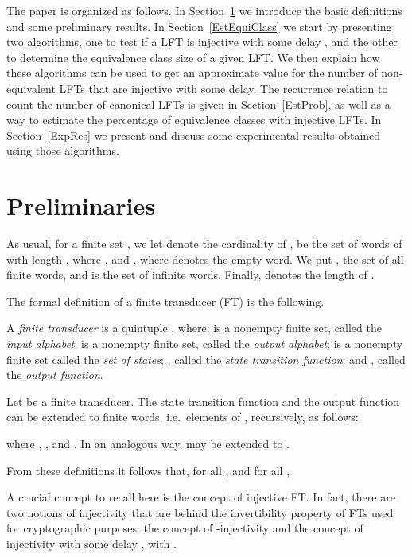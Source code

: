 \documentclass{ocg}
\newcommand{\FT}{FT}
\newcommand{\LFT}{LFT}
\begin{document}
The paper is organized as follows. In Section~\ref{preliminaries} we
introduce the basic definitions and some preliminary results. In
Section~\ref{EstEquiClass} we start by presenting two algorithms, one
to test if a \LFT{} is injective with some delay , and the other
to determine the equivalence class size of a given LFT{}. We then explain how these algorithms can be used to get an
approximate value for the number of non-equivalent \LFT{}s that are
injective with some delay. The recurrence relation to count the number
of canonical \LFT{}s is given in Section~\ref{EstProb}, as well as a
way to estimate the percentage of equivalence classes with injective
\LFT{}s. In Section~\ref{ExpRes} we present and discuss some
experimental results obtained using those algorithms.

\section{Preliminaries}\label{preliminaries}

As usual, for a finite set , we let  denote the cardinality of ,  be the set of words of  with length , where , and , where
 denotes the empty word. We put ,
the set of all finite words, and  is the set of infinite words.  Finally,
 denotes the length of .


The formal definition of a finite transducer (\FT{}) is the following.
\begin{definition}
  A \emph{finite transducer} is a quintuple
  , where:
   is a nonempty finite set, called the \emph{input
      alphabet};
    is a nonempty finite set, called the
    \emph{output alphabet};
    is a nonempty finite set called the \emph{set of states};
   , called the \emph{state
      transition function}; and
   , called the
    \emph{output function}.
\end{definition}


Let  be a finite transducer. The state transition function
 and the output function  can be extended to finite
words, i.e.~elements of , recursively, as follows:

where , , and .  In
an analogous way,  may be extended to .

From these definitions it follows that, for all , and for all ,

A crucial concept to recall here is the concept of injective \FT. In
fact, there are two notions of injectivity that are behind the
invertibility property of \FT{}s used for cryptographic purposes: the
concept of -injectivity and the concept of injectivity with
some delay , with .
\end{document}
